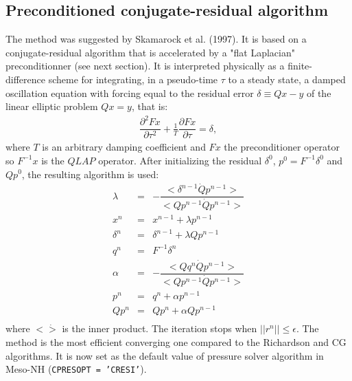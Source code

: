 \subsection{Preconditioned conjugate-residual algorithm}
\par The method was suggested by Skamarock et al. (1997). It is based on a conjugate-residual algorithm that is accelerated by a "flat Laplacian" preconditionner (see next section). It is interpreted physically as a finite-difference scheme for integrating, in a pseudo-time $\tau$ to a steady state, a damped oscillation equation with forcing equal to the residual error $\delta \equiv Qx-y$ of the linear elliptic problem $Qx=y$, that is:
\begin{eqnarray*}
\dfrac{\partial^{2}{Fx} } {\partial{\tau^{2}} } + \frac{1}{T}
\dfrac{\partial{Fx} } {\partial{\tau} } = \delta,
\end{eqnarray*}
where $T$ is an arbitrary damping coefficient and $Fx$ the preconditioner operator so $F^{-1}x$ is the $QLAP$ operator. After initializing the residual $\delta^{0}$, $p^{0}=F^{-1}\delta^{0}$ and $Qp^{0}$, the resulting algorithm is used:
\begin{eqnarray*}
\lambda &=& -\dfrac{<\delta^{n-1} \dot Qp^{n-1}>}{<Qp^{n-1} \dot Qp^{n-1}>}\\
x^{n} &=& x^{n-1} + \lambda p^{n-1} \\
\delta^{n} &=& \delta^{n-1} + \lambda Qp^{n-1} \\
q^{n} &=& F^{-1}\delta^{n} \\
\alpha &=& -\dfrac{<Qq^{n} \dot Qp^{n-1}>}{<Qp^{n-1} \dot Qp^{n-1}>} \\
p^{n} &=& q^{n} + \alpha p^{n-1} \\
Qp^{n} &=& Qp^{n} + \alpha Qp^{n-1} \\
\end{eqnarray*}
where $< \dot >$ is the inner product. The iteration stops when $||r^{n}||\leq\epsilon$. The method is the most efficient converging one compared to the Richardson and CG algorithms. It is now set as the default value of pressure solver algorithm in Meso-NH ({\tt CPRESOPT  = 'CRESI'}).
